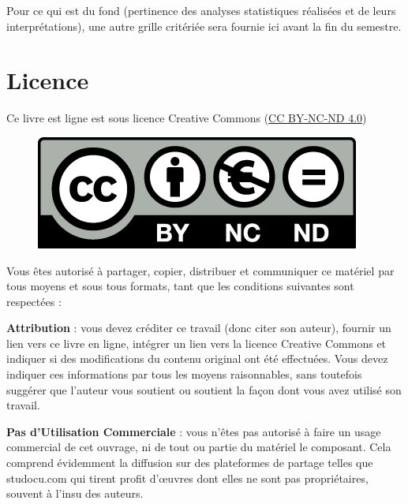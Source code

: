 \documentclass[
  a4paper,
  DIV=11,
  numbers=noendperiod,
  oneside]{scrreprt}
\begin{document}
Pour ce qui est du fond (pertinence des analyses statistiques réalisées
et de leurs interprétations), une autre grille critériée sera fournie
ici avant la fin du semestre.

\hypertarget{licence}{%
\section*{Licence}\label{licence}}

Ce livre est ligne est sous licence Creative Commons
(\href{https://creativecommons.org/licenses/by-nc-nd/4.0/deed.fr}{CC
BY-NC-ND 4.0})

\begin{figure}

{\centering 

\href{https://creativecommons.org/licenses/by-nc-nd/4.0/deed.fr}{\includegraphics{./images/cc_licence.png}}

}

\end{figure}

Vous êtes autorisé à partager, copier, distribuer et communiquer ce
matériel par tous moyens et sous tous formats, tant que les conditions
suivantes sont respectées :

{} \textbf{Attribution} : vous devez
créditer ce travail (donc citer son auteur), fournir un lien vers ce
livre en ligne, intégrer un lien vers la licence Creative Commons et
indiquer si des modifications du contenu original ont été effectuées.
Vous devez indiquer ces informations par tous les moyens raisonnables,
sans toutefois suggérer que l'auteur vous soutient ou soutient la façon
dont vous avez utilisé son travail.

{} \textbf{Pas d'Utilisation Commerciale}
: vous n'êtes pas autorisé à faire un usage commercial de cet ouvrage,
ni de tout ou partie du matériel le composant. Cela comprend évidemment
la diffusion sur des plateformes de partage telles que studocu.com qui
tirent profit d'œuvres dont elles ne sont pas propriétaires, souvent à
l'insu des auteurs.
\end{document}
